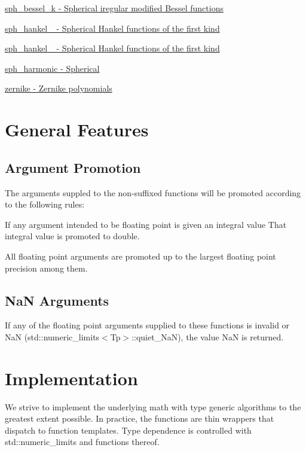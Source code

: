 \begin{DoxyItemize}
\item \hyperlink{group__gnu__math__spec__func_ga737e6fe2f7f4acb6fcc6bccfe2a4c254}{sph\+\_\+bessel\+\_\+k -\/ Spherical iregular modified Bessel functions}
\item \hyperlink{group__gnu__math__spec__func_ga9440f3f92ebc56bd77d64853390247f6}{sph\+\_\+hankel\+\_ -\/ Spherical Hankel functions of the first kind}
\item \hyperlink{group__gnu__math__spec__func_ga4f112ebd12bfbea7f0eea9275a1209ac}{sph\+\_\+hankel\+\_ -\/ Spherical Hankel functions of the first kind}
\item \hyperlink{group__gnu__math__spec__func_ga28f1390a0366bc8c9780918d9720146b}{sph\+\_\+harmonic -\/ Spherical}
\item \hyperlink{group__gnu__math__spec__func_gac43d89238752ed88927867236ab8c6a8}{zernike -\/ Zernike polynomials}
\end{DoxyItemize}\hypertarget{index_general}{}\section{General Features}\label{index_general}
\hypertarget{index_promotion}{}\subsection{Argument Promotion}\label{index_promotion}
The arguments suppled to the non-\/suffixed functions will be promoted according to the following rules\+:
\begin{DoxyEnumerate}
\item If any argument intended to be floating point is given an integral value That integral value is promoted to double.
\item All floating point arguments are promoted up to the largest floating point precision among them.
\end{DoxyEnumerate}\hypertarget{index_NaN}{}\subsection{Na\+N Arguments}\label{index_NaN}
If any of the floating point arguments supplied to these functions is invalid or Na\+N (std\+::numeric\+\_\+limits$<$\+Tp$>$\+::quiet\+\_\+\+Na\+N), the value Na\+N is returned.\hypertarget{index_impl}{}\section{Implementation}\label{index_impl}
We strive to implement the underlying math with type generic algorithms to the greatest extent possible. In practice, the functions are thin wrappers that dispatch to function templates. Type dependence is controlled with std\+::numeric\+\_\+limits and functions thereof.

